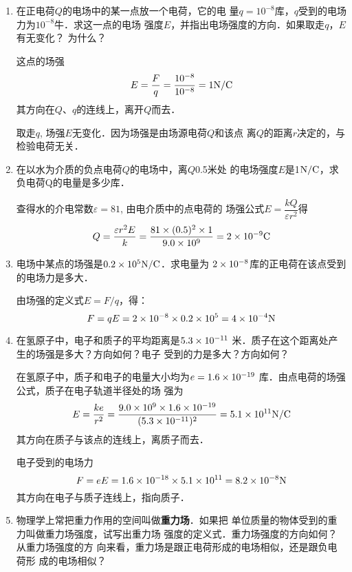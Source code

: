 \begin{enumerate}
	\item 在正电荷$Q$的电场中的某一点放一个电荷，它的电
	量$q=10^{-8}$库，$q$受到的电场力为$10^{-8}$牛．求这一点的电场
	强度$E$，并指出电场强度的方向．如果取走$q$，$E$有无变化？
	为什么？

    \begin{solution}
        这点的场强
\[E=\frac{F}{q}=\frac{10^{-8}}{10^{-8}}=1{\rm N/C}\]
其方向在$Q$、$q$的连线上，离开$Q$而去．

取走$q$, 场强$E$无变化．因为场强是由场源电荷$Q$和该点
离$Q$的距离$r$决定的，与检验电荷无关．
    \end{solution}
    
	\item 在以水为介质的负点电荷$Q$的电场中，离$Q$0.5米处
	的电场强度$E$是1$\text{N}/\text{C}$，求负电荷Q的电量是多少库．

    \begin{solution}
        查得水的介电常数$\varepsilon=81$, 由电介质中的点电荷的
        场强公式$E=\dfrac{kQ}{\varepsilon r^2}$得
   \[     Q=\frac{\varepsilon r^2 E}{k}=\frac{81\times(0.5)^2\times1}{9.0\times10^9}
 =2\times10^{-9}{\rm C}\]
    \end{solution}
    
	\item 电场中某点的场强是$0.2\times10^5\text{N}/\text{C}$．求电量为
	$2\times10^{-8}$库的正电荷在该点受到的电场力是多大．

    \begin{solution}
        由场强的定义式$E=F/q$，得：
 \[       F=qE=2\times10^{-8}\times0.2\times10^5=4\times10^{-4}{\rm N}\]
    \end{solution}
    
	\item 在氢原子中，电子和质子的平均距离是$5.3\times10^{-11}$
	米．质子在这个距离处产生的场强是多大？方向如何？电子
	受到的力是多大？方向如何？

    \begin{solution}
        在氢原子中，质子和电子的电量大小均为$e=1.6\times10^{-19}$
        库．由点电荷的场强公式，质子在电子轨道半径处的场
        强为
\[E=\frac{ke}{r^2}=\frac{9.0\times 10^9\times 1.6\times 10^{-19}}{(5.3\times 10^{-11})^2}=5.1\times 10^{11}{\rm N/C}\]
其方向在质子与该点的连线上，离质子而去．

电子受到的电场力
\[F=eE=1.6\times10^{-18}\times5.1\times10^{11}=8.2\times10^{-8}{\rm N}\]
其方向在电子与质子连线上，指向质子．
    \end{solution}
    
	\item 物理学上常把重力作用的空间叫做\textbf{重力场}．如果把
	单位质量的物体受到的重力叫做重力场强度，试写出重力场
	强度的定义式．重力场强度的方向如何？从重力场强度的方
	向来看，重力场是跟正电荷形成的电场相似，还是跟负电荷形
成的电场相似？


\end{enumerate}
